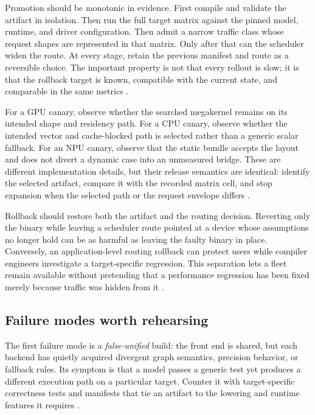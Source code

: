 Promotion should be monotonic in evidence. First compile and validate the artifact in isolation. Then run the full target matrix against the pinned model, runtime, and driver configuration. Then admit a narrow traffic class whose request shapes are represented in that matrix. Only after that can the scheduler widen the route. At every stage, retain the previous manifest and route as a reversible choice. The important property is not that every rollout is slow; it is that the rollback target is known, compatible with the current state, and comparable in the same metrics \citep{patel2025llminference,yirage2026}.

For a GPU canary, observe whether the searched megakernel remains on its intended shape and residency path. For a CPU canary, observe whether the intended vector and cache-blocked path is selected rather than a generic scalar fallback. For an NPU canary, observe that the static bundle accepts the layout and does not divert a dynamic case into an unmeasured bridge. These are different implementation details, but their release semantics are identical: identify the selected artifact, compare it with the recorded matrix cell, and stop expansion when the selected path or the request envelope differs \citep{iree2024,amd2024aie,rotem2018glow}.

Rollback should restore both the artifact and the routing decision. Reverting only the binary while leaving a scheduler route pointed at a device whose assumptions no longer hold can be as harmful as leaving the faulty binary in place. Conversely, an application-level routing rollback can protect users while compiler engineers investigate a target-specific regression. This separation lets a fleet remain available without pretending that a performance regression has been fixed merely because traffic was hidden from it \citep{patel2025llminference,memoryfloor2026}.

\subsection{Failure modes worth rehearsing}

The first failure mode is a \emph{false-unified} build: the front end is shared, but each backend has quietly acquired divergent graph semantics, precision behavior, or fallback rules. Its symptom is that a model passes a generic test yet produces a different execution path on a particular target. Counter it with target-specific correctness tests and manifests that tie an artifact to the lowering and runtime features it requires \citep{iree2024,lai2023relax}.

